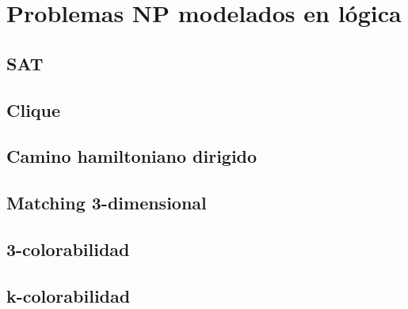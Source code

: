
\chapter{Problemas NP modelados en lógica}
\label{apendiceA}
\section{SAT}
\section{Clique}
\section{Camino hamiltoniano dirigido}
\section{Matching 3-dimensional}
\section{3-colorabilidad}
\section{k-colorabilidad}

